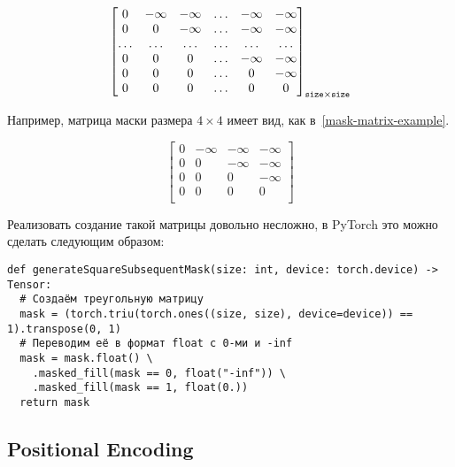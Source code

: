 \begin{equation}\label{mask-matrix}%
  \begin{bmatrix}
    0 & -\infty & -\infty & \ldots & -\infty & -\infty \\
    0 & 0 & -\infty & \ldots & -\infty & -\infty \\ 
    \ldots & \ldots & \ldots & \ldots & \ldots & \ldots \\ 
    0 & 0 & 0 & \ldots & -\infty & -\infty \\ 
    0 & 0 & 0 & \ldots & 0 & -\infty \\ 
    0 & 0 & 0 & \ldots & 0 & 0 \\ 
  \end{bmatrix}_{\text{\texttt{size}} \times \text{\texttt{size}}}  
\end{equation}

Например, матрица маски размера $ 4\times4 $ имеет вид, как в~\eqref{mask-matrix-example}.

\begin{equation}\label{mask-matrix-example}%
  \begin{bmatrix}
    0 & -\infty & -\infty & -\infty \\
    0 & 0 & -\infty & -\infty \\ 
    0 & 0 & 0 & -\infty \\ 
    0 & 0 & 0 & 0 \\ 
  \end{bmatrix}  
\end{equation}

Реализовать создание такой матрицы довольно несложно, в PyTorch это можно сделать следующим образом:

\begin{verbatim}
def generateSquareSubsequentMask(size: int, device: torch.device) -> Tensor:
  # Создаём треугольную матрицу
  mask = (torch.triu(torch.ones((size, size), device=device)) == 1).transpose(0, 1)
  # Переводим её в формат float с 0-ми и -inf
  mask = mask.float() \
    .masked_fill(mask == 0, float("-inf")) \
    .masked_fill(mask == 1, float(0.))
  return mask
\end{verbatim}


\subsection{Positional Encoding}


